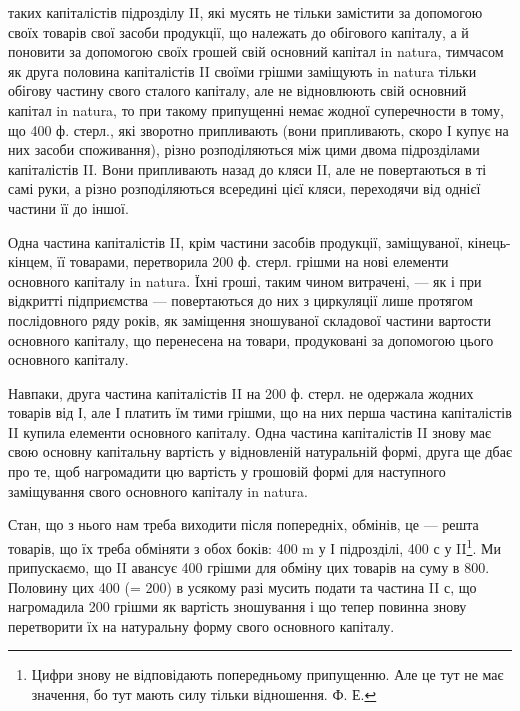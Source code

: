 \parcont{}  %
таких капіталістів підрозділу II, які мусять не тільки замістити за допомогою
своїх товарів свої засоби продукції, що належать до обігового
капіталу, а й поновити за допомогою своїх грошей свій основний
капітал in natura, тимчасом як друга половина капіталістів II своїми
грішми заміщують  in natura тільки обігову частину свого сталого капіталу,
але не відновлюють свій основний капітал  in natura, то при такому
припущенні немає жодної суперечности в тому, що 400 ф. стерл., які зворотно
припливають (вони припливають, скоро І купує на них засоби
споживання), різно розподіляються між цими двома підрозділами капіталістів
II. Вони припливають назад до кляси II, але не повертаються в ті
самі руки, а різно розподіляються всередині цієї кляси, переходячи від
однієї частини її до іншої.

Одна частина капіталістів II, крім частини засобів продукції, заміщуваної,
кінець-кінцем, її товарами, перетворила 200 ф. стерл. грішми на
нові елементи основного капіталу  in natura. Їхні гроші, таким чином
витрачені, — як і при відкритті підприємства — повертаються до них з циркуляції
лише протягом послідовного ряду років, як заміщення зношуваної
складової частини вартости основного капіталу, що перенесена на товари,
продуковані за допомогою цього основного капіталу.

Навпаки, друга частина капіталістів II на 200 ф. стерл. не одержала
жодних товарів від І, але І платить їм тими грішми, що на них перша
частина капіталістів II купила елементи основного капіталу. Одна частина
капіталістів II знову має свою основну капітальну вартість у відновленій
натуральній формі, друга ще дбає про те, щоб нагромадити цю вартість
у грошовій формі для наступного заміщування свого основного капіталу
in natura.

Стан, що з нього нам треба виходити після попередніх, обмінів, це —
решта товарів, що їх треба обміняти з обох боків: 400 m у І підрозділі, 400 с
у II\footnote{
Цифри знову не відповідають попередньому припущенню. Але це тут не має
значення, бо тут мають силу тільки відношення. Ф. Е.
}. Ми припускаємо, що II авансує 400 грішми для обміну цих товарів
на суму в 800. Половину цих 400 (= 200) в усякому разі мусить подати
та частина II с, що нагромадила 200 грішми як вартість зношування
і що тепер повинна знову перетворити їх на натуральну форму свого
основного капіталу.

